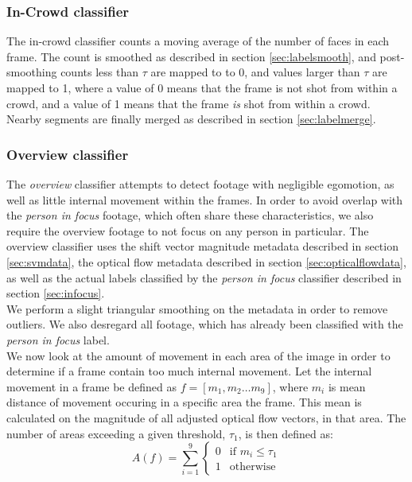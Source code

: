 \subsubsection{In-Crowd classifier}\label{sec:incrowd}
%
The in-crowd classifier counts a moving average of the number of faces in each frame. The count is smoothed as described in section \ref{sec:labelsmooth}, and post-smoothing counts less than $\tau$ are mapped to to 0, and values larger than $\tau$ are mapped to 1, where a value of 0 means that the frame is not shot from within a crowd, and a value of 1 means that the frame \emph{is} shot from within a crowd. Nearby segments are finally merged as described in section \ref{sec:labelmerge}.
%
\subsubsection{Overview classifier}\label{sec:overviewclassifier}
%
The \textit{overview} classifier attempts to detect footage with negligible egomotion, as well as little internal movement within the frames. In order to avoid overlap with the \textit{person in focus} footage, which often share these characteristics, we also require the overview footage to not focus on any person in particular. The overview classifier uses the shift vector magnitude metadata described in section \ref{sec:svmdata}, the optical flow metadata described in section \ref{sec:opticalflowdata}, as well as the actual labels classified by the \textit{person in focus} classifier described in section \ref{sec:infocus}.\\
We perform a slight triangular smoothing on the metadata in order to remove outliers. We also desregard all footage, which has already been classified with the \textit{person in focus} label.\\
We now look at the amount of movement in each area of the image in order to determine if a frame contain too much internal movement. Let the internal movement in a frame be defined as $f = [m_{1},m_{2} \dots m_{9}]$, where $m_{i}$ is mean distance of movement occuring in a specific area the frame. This mean is calculated on the magnitude of all adjusted optical flow vectors, in that area. The number of areas exceeding a given threshold, $\tau_{1}$, is then defined as:
%
\begin{equation}
A(f) = \sum_{i=1}^{9}
\begin{cases}
0 & \text{if } m_{i} \leq \tau_{1}\\
1 &  \text{otherwise}
\end{cases}
\end{equation}
